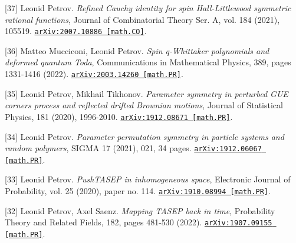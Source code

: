 \begin{etaremune}
\item[{[37]}] 
Leonid Petrov.
\emph{Refined Cauchy identity for spin Hall-Littlewood symmetric rational functions}, Journal of Combinatorial Theory Ser. A, vol. 184 (2021), 105519. 
\href{https://arxiv.org/abs/2007.10886}{\texttt{arXiv:2007.10886 [math.CO]}}.







\item[{[36]}] 
Matteo Mucciconi, Leonid Petrov.
\emph{Spin q-Whittaker polynomials and deformed quantum Toda}, Communications in Mathematical Physics, 389, pages 1331-1416 (2022). 
\href{https://arxiv.org/abs/2003.14260}{\texttt{arXiv:2003.14260 [math.PR]}}.









\item[{[35]}] 
Leonid Petrov, Mikhail Tikhonov.
\emph{Parameter symmetry in perturbed GUE corners process and reflected drifted Brownian motions}, Journal of Statistical Physics, 181 (2020), 1996-2010. 
\href{https://arxiv.org/abs/1912.08671}{\texttt{arXiv:1912.08671 [math.PR]}}.



\item[{[34]}] 
Leonid Petrov.
\emph{Parameter permutation symmetry in particle systems and random polymers}, SIGMA 17 (2021), 021, 34 pages. 
\href{https://arxiv.org/abs/1912.06067}{\texttt{arXiv:1912.06067 [math.PR]}}.



\item[{[33]}] 
Leonid Petrov.
\emph{PushTASEP in inhomogeneous space}, Electronic Journal of Probability, vol. 25 (2020), paper no. 114. 
\href{https://arxiv.org/abs/1910.08994}{\texttt{arXiv:1910.08994 [math.PR]}}.









\item[{[32]}] 
Leonid Petrov, Axel Saenz.
\emph{Mapping TASEP back in time}, Probability Theory and Related Fields, 182, pages 481-530 (2022). 
\href{https://arxiv.org/abs/1907.09155}{\texttt{arXiv:1907.09155 [math.PR]}}.










\end{etaremune}
